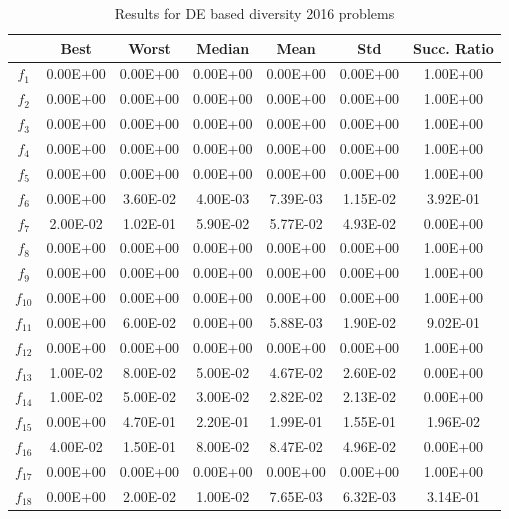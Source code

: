 \begin{table}[t]
\begin{scriptsize}
\centering
\caption{Results for DE based diversity \CEC{} 2016 problems}
\label{tab:Results_CEC2016}
\begin{tabular}{|c|c|c|c|c|c|c|}
\hline
 & \textbf{Best} & \textbf{Worst} & \textbf{Median} & \textbf{Mean} & \textbf{Std} & \textbf{Succ. Ratio} \\ \hline
$f_1$ & 0.00E+00 & 0.00E+00 & 0.00E+00 & 0.00E+00 & 0.00E+00 & 1.00E+00 \\ \hline
$f_2$ & 0.00E+00 & 0.00E+00 & 0.00E+00 & 0.00E+00 & 0.00E+00 & 1.00E+00 \\ \hline
$f_3$ & 0.00E+00 & 0.00E+00 & 0.00E+00 & 0.00E+00 & 0.00E+00 & 1.00E+00 \\ \hline
$f_4$ & 0.00E+00 & 0.00E+00 & 0.00E+00 & 0.00E+00 & 0.00E+00 & 1.00E+00 \\ \hline
$f_5$ & 0.00E+00 & 0.00E+00 & 0.00E+00 & 0.00E+00 & 0.00E+00 & 1.00E+00 \\ \hline
$f_6$ & 0.00E+00 & 3.60E-02 & 4.00E-03 & 7.39E-03 & 1.15E-02 & 3.92E-01 \\ \hline
$f_7$ & 2.00E-02 & 1.02E-01 & 5.90E-02 & 5.77E-02 & 4.93E-02 & 0.00E+00 \\ \hline
$f_8$ & 0.00E+00 & 0.00E+00 & 0.00E+00 & 0.00E+00 & 0.00E+00 & 1.00E+00 \\ \hline
$f_9$ & 0.00E+00 & 0.00E+00 & 0.00E+00 & 0.00E+00 & 0.00E+00 & 1.00E+00 \\ \hline
$f_{10}$ & 0.00E+00 & 0.00E+00 & 0.00E+00 & 0.00E+00 & 0.00E+00 & 1.00E+00 \\ \hline
$f_{11}$ & 0.00E+00 & 6.00E-02 & 0.00E+00 & 5.88E-03 & 1.90E-02 & 9.02E-01 \\ \hline
$f_{12}$ & 0.00E+00 & 0.00E+00 & 0.00E+00 & 0.00E+00 & 0.00E+00 & 1.00E+00 \\ \hline
$f_{13}$ & 1.00E-02 & 8.00E-02 & 5.00E-02 & 4.67E-02 & 2.60E-02 & 0.00E+00 \\ \hline
$f_{14}$ & 1.00E-02 & 5.00E-02 & 3.00E-02 & 2.82E-02 & 2.13E-02 & 0.00E+00 \\ \hline
$f_{15}$ & 0.00E+00 & 4.70E-01 & 2.20E-01 & 1.99E-01 & 1.55E-01 & 1.96E-02 \\ \hline
$f_{16}$ & 4.00E-02 & 1.50E-01 & 8.00E-02 & 8.47E-02 & 4.96E-02 & 0.00E+00 \\ \hline
$f_{17}$ & 0.00E+00 & 0.00E+00 & 0.00E+00 & 0.00E+00 & 0.00E+00 & 1.00E+00 \\ \hline
$f_{18}$ & 0.00E+00 & 2.00E-02 & 1.00E-02 & 7.65E-03 & 6.32E-03 & 3.14E-01 \\ \hline

\end{tabular}
\end{scriptsize}
\end{table}
